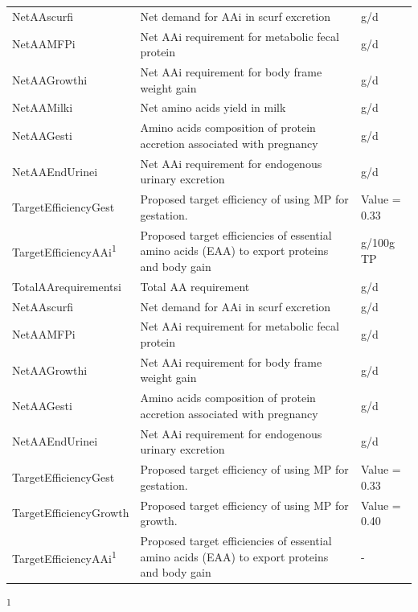 \documentclass{article}
\begin{document}
\begin{refsection}
\begin{longtable}{@{} L{5cm} L{5.5cm} L{2.5cm} @{}}
NetAAscurfi &  Net demand for AAi in scurf excretion  &  g/d\\
NetAAMFPi &   Net AAi requirement for metabolic fecal protein  &  g/d\\
NetAAGrowthi &   Net AAi requirement for body frame weight gain &   g/d\\
NetAAMilki &   Net amino acids yield in milk  &  g/d\\
NetAAGesti &   Amino acids composition of protein accretion associated with pregnancy &   g/d\\
NetAAEndUrinei &   Net AAi requirement for endogenous urinary excretion &   g/d\\
TargetEfficiencyGest &   Proposed target efficiency of using MP for gestation.  &  Value = 0.33 \\

TargetEfficiencyAAi\textsuperscript{1} & Proposed target efficiencies of essential amino acids (EAA) to export proteins and body gain  &  g/100g TP \\
TotalAArequirementsi &  Total AA requirement &  g/d\\
NetAAscurfi &  Net demand for AAi in scurf excretion  & g/d\\
NetAAMFPi &  Net AAi requirement for metabolic fecal protein  & g/d\\
NetAAGrowthi &  Net AAi requirement for body frame weight gain &  g/d\\
NetAAGesti &  Amino acids composition of protein accretion associated with pregnancy &  g/d\\
NetAAEndUrinei &  Net AAi requirement for endogenous urinary excretion  & g/d\\
TargetEfficiencyGest &  Proposed target efficiency of using MP for gestation.  & Value = 0.33\\
TargetEfficiencyGrowth &  Proposed target efficiency of using MP for growth.  & Value = 0.40\\
TargetEfficiencyAAi\textsuperscript{1} &  Proposed target efficiencies of essential amino acids (EAA) to export proteins and body gain  &  -\\
    \end{longtable}
\vspace{-0.5cm}

\begin{flushleft}
\textsuperscript{1} \cite{nrc2021}
\end{flushleft}






\end{refsection}
\end{document}
